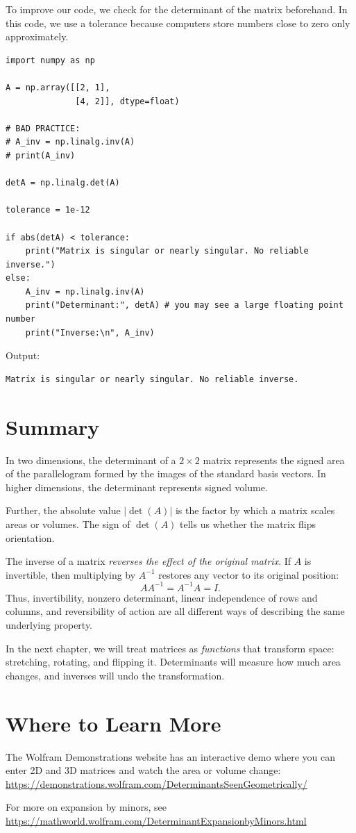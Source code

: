 To improve our code, we check for the determinant of the matrix beforehand. In this code, we use a tolerance because computers store numbers close to zero only approximately.
\begin{verbatim}
import numpy as np

A = np.array([[2, 1],
              [4, 2]], dtype=float)

# BAD PRACTICE:
# A_inv = np.linalg.inv(A)
# print(A_inv)

detA = np.linalg.det(A)

tolerance = 1e-12  

if abs(detA) < tolerance: 
    print("Matrix is singular or nearly singular. No reliable inverse.")
else:
    A_inv = np.linalg.inv(A)
    print("Determinant:", detA) # you may see a large floating point number
    print("Inverse:\n", A_inv)
\end{verbatim}
Output:
\begin{verbatim}
Matrix is singular or nearly singular. No reliable inverse.
\end{verbatim}
\section{Summary}
In two dimensions, the determinant of a \(2 \times 2\) matrix represents the signed area of the parallelogram formed by the images of the standard basis vectors. 
In higher dimensions, the determinant represents signed volume.

Further, the absolute value \(|\det(A)|\) is the factor by which a matrix scales areas or volumes. The sign of \(\det(A)\) tells us whether the matrix flips orientation.

The inverse of a matrix \emph{reverses the effect of the original matrix}.
If \(A\) is invertible, then multiplying by \(A^{-1}\) restores any vector to its original position:
\[
AA^{-1} = A^{-1}A = I.
\]
Thus, invertibility, nonzero determinant, linear independence of rows and columns, and reversibility of action are all different ways of describing the same underlying property.

In the next chapter, we will treat matrices as \emph{functions} that
transform space: stretching, rotating, and flipping it. Determinants will
measure how much area changes, and inverses will undo the transformation.

\section{Where to Learn More}
The Wolfram Demonstrations website has an interactive demo where you can
enter 2D and 3D matrices and watch the area or volume change:
\url{https://demonstrations.wolfram.com/DeterminantsSeenGeometrically/}

For more on expansion by minors, see
\url{https://mathworld.wolfram.com/DeterminantExpansionbyMinors.html}
